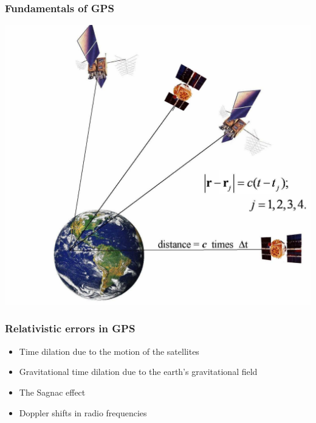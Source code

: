 \documentclass[xcolor=dvipsnames,usepdftitle=false]{beamer}
\begin{document}
\begin{frame}

\frametitle{Fundamentals of GPS}

\begin{center}

\includegraphics[scale=0.18]{images/eqn.png}

\end{center}

\end{frame}

\begin{frame}

\frametitle{Relativistic errors in GPS}

\begin{itemize}
	\item Time dilation due to the motion of the satellites
	\item Gravitational time dilation due to the earth's gravitational field
	\item The Sagnac effect
	\item Doppler shifts in radio frequencies
\end{itemize}

\end{frame}
\end{document}
